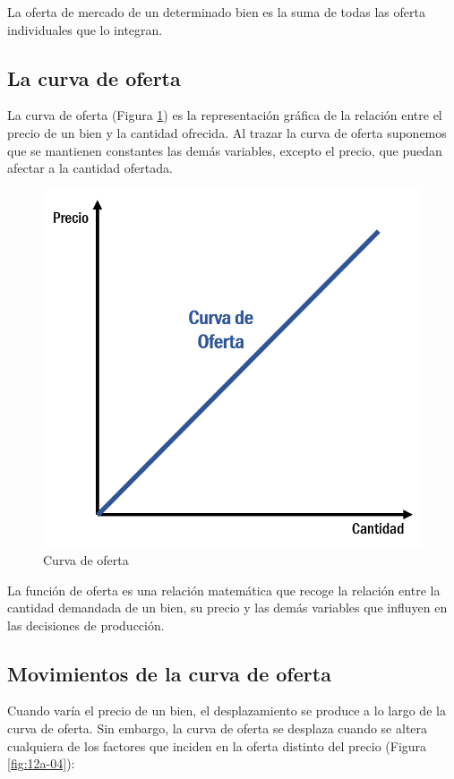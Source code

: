 \documentclass[
]{krantz}
\begin{document}
La oferta de mercado de un determinado bien es la suma de todas las oferta individuales que lo integran.

\hypertarget{la-curva-de-oferta}{%
\subsection{La curva de oferta}\label{la-curva-de-oferta}}

La curva de oferta (Figura \ref{fig:12a-03}) es la representación gráfica de la relación entre el precio de un bien y la cantidad ofrecida. Al trazar la curva de oferta suponemos que se mantienen constantes las demás variables, excepto el precio, que puedan afectar a la cantidad ofertada.

\begin{figure}

{\centering \includegraphics[width=0.5\linewidth]{images/12a-03} 

}

\caption{Curva de oferta}\label{fig:12a-03}
\end{figure}

La función de oferta es una relación matemática que recoge la relación entre la cantidad demandada de un bien, su precio y las demás variables que influyen en las decisiones de producción.

\hypertarget{movimientos-de-la-curva-de-oferta}{%
\subsection{Movimientos de la curva de oferta}\label{movimientos-de-la-curva-de-oferta}}

Cuando varía el precio de un bien, el desplazamiento se produce a lo largo de la curva de oferta. Sin embargo, la curva de oferta se desplaza cuando se altera cualquiera de los factores que inciden en la oferta distinto del precio (Figura \ref{fig:12a-04}):
\end{document}
